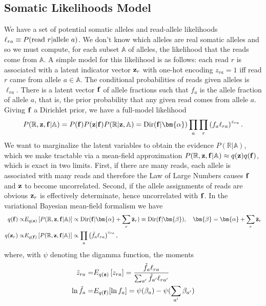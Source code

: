 \documentclass[nofootinbib,amssymb,amsmath]{revtex4}
\newcommand{\vf}{{\bf f}}
\newcommand{\vz}{{\bf z}}
\newcommand{\valpha}{{\bm{\alpha}}}
\newcommand{\vbeta}{{\bm{\beta}}}
\begin{document}
\subsection{Somatic Likelihoods Model}\label{introduction}
We have a set of potential somatic alleles and read-allele likelihoods $\ell_{ra} \equiv P({\rm read~}r|{\rm allele~}a)$.  We don't know which alleles are real somatic alleles and so we must compute, for each subset $\mathbb{A}$ of alleles, the likelihood that the reads come from $\mathbb{A}$.  A simple model for this likelihood is as follows: each read $r$ is associated with a latent indicator vector $\vz_r$ with one-hot encoding $z_{ra} = 1$ iff read $r$ came from allele $a \in \mathbb{A}$.  The conditional probabilities of reads given alleles is $\ell_{ra}$.
There is a latent vector $\vf$ of allele fractions such that $f_a$ is the allele fraction of allele $a$, that is, the prior probability that any given read comes from allele $a$.  Giving $\vf$ a Dirichlet prior, we have a full-model likelihood
\begin{equation}
P(\mathbb{R}, \vz, \vf | \mathbb{A}) = P(\vf) P(\vz | \vf)  P( \mathbb{R} | \vz, \mathbb{A}) = {\rm Dir}(\vf | \valpha) \prod_a  \prod_r \left( f_a \ell_{ra}\right)^{z_{ra}}.
\label{full_likelihood}
\end{equation}
We want to marginalize the latent variables to obtain the evidence $P(\mathbb{R} | \mathbb{A})$, which we make tractable via a mean-field approximation $P(\mathbb{R}, \vz, \vf | \mathbb{A}) \approx q(\vz) q(\vf)$, which is exact in two limits.  First, if there are many reads, each allele is associated with many reads and therefore the Law of Large Numbers causes $\vf$ and $\vz$ to become uncorrelated.  Second, if the allele assignments of reads are obvious $\vz_r$ is effectively determinate, hence uncorrelated with $\vf$.  In the variational Bayesian mean-field formalism we have
\begin{align}
q(\vf) \propto& E_{q(\vz)} \left[ P(\mathbb{R}, \vz, \vf | \mathbb{A}) \right] \propto {\rm Dir}(\vf | \valpha + \sum_r \bar{\vz}_r) \equiv {\rm Dir}(\vf | \vbeta), \quad \vbeta = \valpha + \sum_r \bar{\vz}_r \label{z_mean_field}  \\
q(\vz_r) \propto& E_{q(\vf)} \left[ P(\mathbb{R}, \vz, \vf | \mathbb{A}) \right]  \propto \prod_a \left( \tilde{f}_a \ell_{ra}\right)^{z_{ra}}, \label{f_mean_field}
\end{align}
where, with $\psi$ denoting the digamma function, the moments
\begin{align}
\bar{z}_{ra} =& E_{q(\vz)} \left[ z_{ra} \right] = \frac{\tilde{f}_a \ell_{ra}}{\sum_{a^\prime} \tilde{f}_{a^\prime} \ell_{ra^\prime}} \\
\ln \tilde{f}_a =& E_{q(\vf)}[\ln f_a] = \psi(\beta_a) - \psi(\sum_{a^\prime} \beta_{a^\prime})
\end{align}
\end{document}
